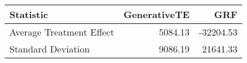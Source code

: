 \begin{tabular}{lrr}
\toprule
Statistic & GenerativeTE & GRF \\
\midrule
Average Treatment Effect & 5084.13 & -32204.53 \\
Standard Deviation & 9086.19 & 21641.33 \\
\bottomrule
\end{tabular}
